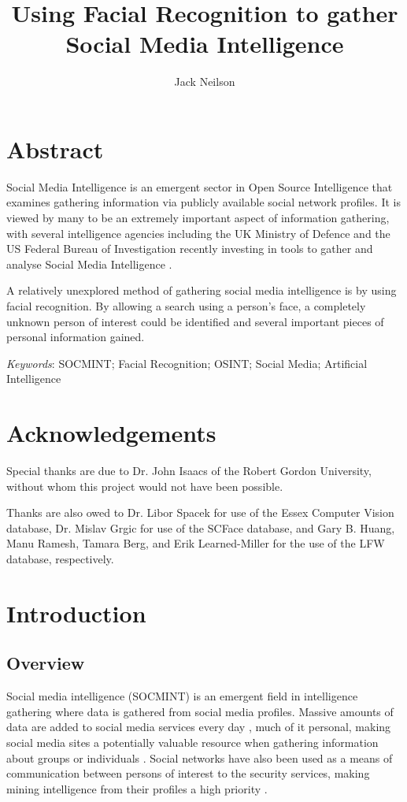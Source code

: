 \documentclass[12pt]{article}
\begin{document}
\title{Using Facial Recognition to gather Social Media Intelligence}
\author{Jack Neilson}
\maketitle
\newpage
\tableofcontents
\newpage

\section{Abstract}
Social Media Intelligence is an emergent sector in Open Source Intelligence that examines gathering information via publicly available social network profiles. It is viewed by many to be an extremely important aspect of information gathering, with several intelligence agencies including the UK Ministry of Defence and the US Federal Bureau of Investigation recently investing in tools to gather and analyse Social Media Intelligence \citep{socmintpublicsafety}.

A relatively unexplored method of gathering social media intelligence is by using facial recognition. By allowing a search using a person's face, a completely unknown person of interest could be identified and several important pieces of personal information gained.

\textit{Keywords}: SOCMINT; Facial Recognition; OSINT; Social Media; Artificial Intelligence

\section{Acknowledgements}
Special thanks are due to Dr. John Isaacs of the Robert Gordon University, without whom this project would not have been possible.

Thanks are also owed to Dr. Libor Spacek for use of the Essex Computer Vision database, Dr. Mislav Grgic for use of the SCFace database, and Gary B. Huang, Manu Ramesh, Tamara Berg, and Erik Learned-Miller for the use of the LFW database, respectively.

\newpage
\section{Introduction}
\subsection{Overview}
Social media intelligence (SOCMINT) is an emergent field in intelligence gathering where data is gathered from social media profiles. Massive amounts of data are added to social media services every day \citep{socmintoverview}, much of it personal, making social media sites a potentially valuable resource when gathering information about groups or individuals \citep{gchqmasssurveillance}. Social networks have also been used as a means of communication between persons of interest to the security services, making mining intelligence from their profiles a high priority \citep{socmintoverview}\citep{policesocmint}.
\end{document}
